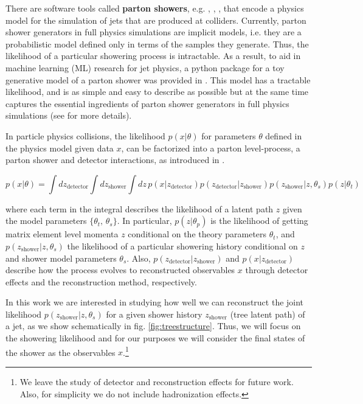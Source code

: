 \documentclass[12pt]{article}
\def\beq{\begin{equation}}
\def\eeq{\end{equation}}
\def\beq{\begin{equation}}
\def\eeq{\end{equation}}
\newcommand{\MYhref}[3][blue]{\href{#2}{\color{#1}{#3}}}%
\begin{document}
 There are software tools called {\bf parton showers}, e.g. \MYhref{http://home.thep.lu.se/Pythia/}{PYTHIA}, \MYhref{https://herwig.hepforge.org/}{Herwig}, \MYhref{https://sherpa.hepforge.org/trac/wiki}{Sherpa}, that encode a physics model for the simulation of jets that are produced at colliders. Currently, parton shower generators in full physics simulations are implicit models, i.e. they are a probabilistic model defined only in terms of the samples they generate. Thus, the likelihood of a particular showering process is intractable. As a result, to aid in machine learning (ML) research for jet physics, a python package for a toy generative model of a parton shower was provided in \cite{ToyJetsShowerPackage}. This model has a tractable likelihood, and is as simple and easy to describe as possible but at the same time captures the essential ingredients of parton shower generators in full physics simulations (see \cite{ToyJetsShower} for more details).
 
In particle physics collisions, the likelihood $p(x| \theta) $ for parameters $\theta$ defined in the physics model given data $x$, can be factorized into a parton level-process, a parton shower and detector interactions, as introduced in \cite{Brehmer:2018kdj}.  


\beq
p(x|\theta) = \int dz_{\text{detector}} \int dz_{\text{shower}} \int dz \,p(x|z_{\text{detector}})  p(z_{\text{detector}}| z_{\text{shower}})  p(z_{\text{shower}}|z,\theta_s) p(z|\theta_t)
\eeq

where each term in the integral describes the likelihood of a latent path $z$ given the model parameters $\{\theta_t,\,\theta_s\}$. In particular, $p(z|\theta_p)$ is the likelihood of getting matrix element level momenta $z$ conditional on the theory parameters $\theta_t$, and $p(z_{\text{shower}}|z,\theta_s)$ the likelihood of a particular showering history conditional on $z$ and shower model parameters $\theta_s$. Also, $p(z_{\text{detector}}| z_{\text{shower}})$ and $p(x|z_{\text{detector}})$ describe how the process evolves to reconstructed observables $x$ through detector effects and the reconstruction method, respectively.

In this work we are interested in studying how well we can reconstruct the joint likelihood $p(z_{\text{shower}}|z,\theta_s)$ for a given shower history $z_{\text{shower}}$ (tree latent path) of a jet, as we show schematically in fig. \ref{fig:treestructure}. Thus, we will focus on the showering likelihood and for our purposes we will consider the final states of the shower as the observables $x$.\footnote{We leave the study of detector and reconstruction effects for future work. Also, for simplicity we do not include hadronization effects.}
\end{document}
